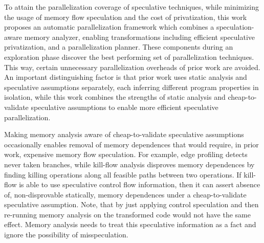 To attain the parallelization coverage of speculative techniques,
while minimizing the usage of memory flow speculation and the cost of
privatization,
%
this work proposes an automatic parallelization framework which
combines a speculation-aware memory analyzer, enabling transformations
including efficient speculative privatization, and a parallelization
planner. These components during an exploration phase discover the
best performing set of parallelization techniques. This way, certain
unnecessary parallelization overheads of prior work are avoided.
%
%
%
%
An important distinguishing factor is that prior work uses static
analysis and speculative assumptions separately, each inferring
different program properties in isolation, while this work combines
the strengths of static analysis and cheap-to-validate speculative
assumptions to enable more efficient speculative parallelization.
%
%
%
%

Making memory analysis aware of cheap-to-validate speculative
assumptions occasionally enables removal of memory dependences that
would require, in prior work, expensive memory flow speculation.
%
For example,
edge profiling detects never taken branches, while kill-flow analysis
disproves memory dependences by finding killing operations along all
feasible paths between two operations. If kill-flow is able to use
speculative control flow information, then it can assert absence of,
non-disprovable statically, memory dependences under a
cheap-to-validate speculative assumption.
%
Note, that by just applying control speculation and then re-running
memory analysis on the transformed code would not have the same
effect.  Memory analysis needs to treat this speculative information
as a fact and ignore the possibility of misspeculation.

